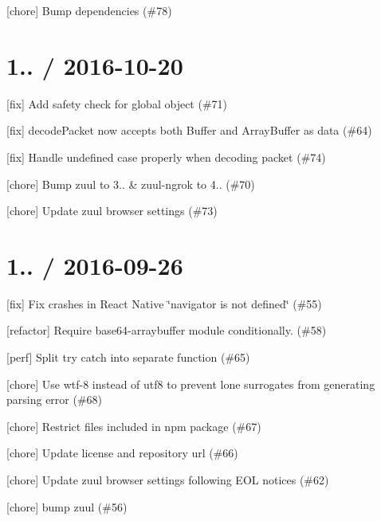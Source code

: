 
\begin{DoxyItemize}
\item \mbox{[}chore\mbox{]} Bump dependencies (\#78)
\end{DoxyItemize}

\section*{1.. / 2016-\/10-\/20 }


\begin{DoxyItemize}
\item \mbox{[}fix\mbox{]} Add safety check for global object (\#71)
\item \mbox{[}fix\mbox{]} decode\+Packet now accepts both Buffer and Array\+Buffer as data (\#64)
\item \mbox{[}fix\mbox{]} Handle undefined case properly when decoding packet (\#74)
\item \mbox{[}chore\mbox{]} Bump zuul to 3.. \& zuul-\/ngrok to 4.. (\#70)
\item \mbox{[}chore\mbox{]} Update zuul browser settings (\#73)
\end{DoxyItemize}

\section*{1.. / 2016-\/09-\/26 }


\begin{DoxyItemize}
\item \mbox{[}fix\mbox{]} Fix crashes in React Native \char`\"{}navigator is not defined\char`\"{} (\#55)
\item \mbox{[}refactor\mbox{]} Require base64-\/arraybuffer module conditionally. (\#58)
\item \mbox{[}perf\mbox{]} Split try catch into separate function (\#65)
\item \mbox{[}chore\mbox{]} Use wtf-\/8 instead of utf8 to prevent lone surrogates from generating parsing error (\#68)
\item \mbox{[}chore\mbox{]} Restrict files included in npm package (\#67)
\item \mbox{[}chore\mbox{]} Update license and repository url (\#66)
\item \mbox{[}chore\mbox{]} Update zuul browser settings following E\+OL notices (\#62)
\item \mbox{[}chore\mbox{]} bump zuul (\#56)
\end{DoxyItemize}

